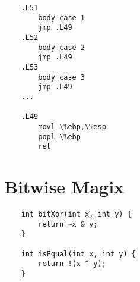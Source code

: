 \documentclass[a4paper, 11pt]{article}
\begin{document}
\begin{lstlisting}
	.L51
		body case 1
		jmp .L49
	.L52
		body case 2
		jmp .L49
	.L53
		body case 3
		jmp .L49
	...
	
	.L49
		movl \%ebp,\%esp
		popl \%ebp
		ret
\end{lstlisting}


\section{Bitwise Magix}
\begin{lstlisting}
	int bitXor(int x, int y) {
		return ~x & y;
	}
	
	int isEqual(int x, int y) {
		return !(x ^ y);
	}
\end{lstlisting}
\end{document}
